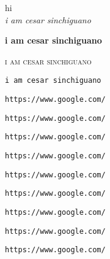 \documentclass[10]{article}
\begin{document}
hi\\
\textit{i am cesar sinchiguano}

\textbf{i am cesar sinchiguano}

\textsc{i am cesar sinchiguano}

\texttt{i am cesar sinchiguano}

\texttt{https://www.google.com/}

\begin{large}
\texttt{https://www.google.com/}
\end{large}


\begin{small}
\texttt{https://www.google.com/}
\end{small}

\begin{Large}
\texttt{https://www.google.com/}
\end{Large}


\begin{huge}
\texttt{https://www.google.com/}
\end{huge}

\begin{Huge}
\texttt{https://www.google.com/}
\end{Huge}

\begin{center}
\begin{Huge}
\texttt{https://www.google.com/}
\end{Huge}
\end{center}




\begin{flushleft}
\begin{Huge}
\texttt{https://www.google.com/}
\end{Huge}
\end{flushleft}




\begin{flushright}
\begin{Huge}
\texttt{https://www.google.com/}
\end{Huge}
\end{flushright}
\end{document}
